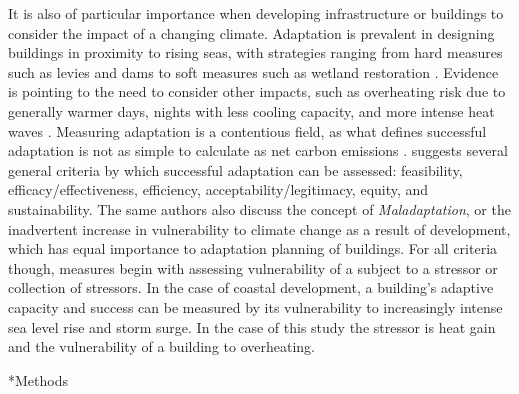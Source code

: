 \documentclass[twocolumn, a4paper,10pt]{article}
\makeatletter
\renewcommand\section{\@startsection{section}{1}{\z@}{3pt}{3pt}{\normalfont\large\bfseries}}
\makeatother
\begin{document}
It is also of particular importance when developing infrastructure or buildings to consider the impact of a changing climate. Adaptation is prevalent in designing buildings in proximity to rising seas, with strategies ranging from hard measures such as levies and dams to soft measures such as wetland restoration \citep{pachauri_climate_2015}. Evidence is pointing to the need to consider other impacts, such as overheating risk due to generally warmer days, nights with less cooling capacity, and more intense heat waves \citep{lomas_overheating_2017,rysanek_forecasting_2021}. Measuring adaptation is a contentious field, as what defines successful adaptation is not as simple to calculate as net carbon emissions \citep{pachauri_climate_2015}. \citet{brooks_tracking_2011} suggests several general criteria by which successful adaptation can be assessed: feasibility, efficacy/effectiveness, efficiency, acceptability/legitimacy, equity, and sustainability. The same authors also discuss the concept of \textit{Maladaptation}, or the inadvertent increase in vulnerability to climate change as a result of development, which has equal importance to adaptation planning of buildings. For all criteria though, measures begin with assessing vulnerability of a subject to a stressor or collection of stressors. In the case of coastal development, a building's adaptive capacity and success can be measured by its vulnerability to increasingly intense sea level rise and storm surge. In the case of this study the stressor is heat gain and the vulnerability of a building to overheating. 

\section*{Methods}
\end{document}

